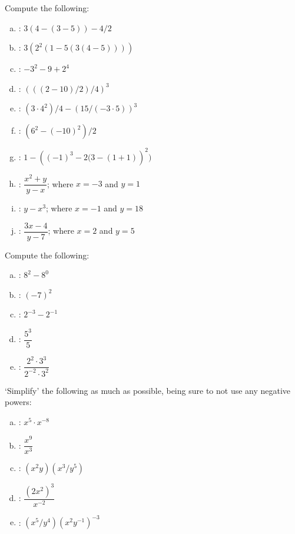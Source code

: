 \documentclass[11pt,letterpaper]{article}
\begin{document}
\newpage



 Compute the following: \pvspace{0.2cm}
\begin{enumerate}[(a)] \itemsep=2ex
\item \uans{3cm}: \qquad $3 \left( 4 - \left(3 - 5 \right) \right) - 4/2$
\item \uans{3cm}: \qquad $3 \left( 2^2 \left( 1 - 5 \left( 3 \left(4 - 5 \right) \right) \right) \right)$
\item \uans{3cm}: \qquad $-3^2 - 9 + 2^4$
\item \uans{3cm}: \qquad $\left( \left( (2 - 10 ) / 2 \right) / 4 \right)^3$
\item \uans{3cm}: \qquad $(3 \cdot 4^2)/4 - \left(15 / \left(-3 \cdot 5 \right) \right)^3$
\item \uans{3cm}: \qquad $\left(6^2 - (-10)^2 \right)/2$
\item \uans{3cm}: \qquad $1 - \left( (-1)^3 - 2(3 - (1 +1) \right)^2 )$
\item \uans{3cm}: \qquad $\dfrac{x^2 + y}{y - x}$; where $x= -3$ and $y= 1$
\item \uans{3cm}: \qquad $y - x^3$; where $x= -1$ and $y= 18$
\item \uans{3cm}: \qquad $\dfrac{3x - 4}{y - 7}$; where $x= 2$ and $y= 5$
\end{enumerate}



\vfill



 Compute the following: \pvspace{0.2cm}
\begin{enumerate}[(a)] \itemsep=2ex
\item \uans{3cm}: \qquad $8^2 - 8^0$
\item \uans{3cm}: \qquad $(-7)^2$
\item \uans{3cm}: \qquad $2^{-3} - 2^{-1}$
\item \uans{3cm}: \qquad $\dfrac{5^3}{5}$
\item \uans{3cm}: \qquad $\dfrac{2^2 \cdot 3^3}{2^{-2} \cdot 3^2}$
\end{enumerate}



\vfill
\newpage



 `Simplify' the following as much as possible, being sure to not use any negative powers: \pvspace{0.2cm}
\begin{enumerate}[(a)] \itemsep=2ex
\item \uans{3cm}: \qquad $x^5 \cdot x^{-8}$
\item \uans{3cm}: \qquad $\dfrac{x^9}{x^3}$
\item \uans{3cm}: \qquad $(x^2 y)(x^3/y^5)$
\item \uans{3cm}: \qquad $\dfrac{(2x^2)^3}{x^{-2}}$
\item \uans{3cm}: \qquad $(x^5/y^4)(x^2 y^{-1})^{-3}$
\end{enumerate}
\end{document}
